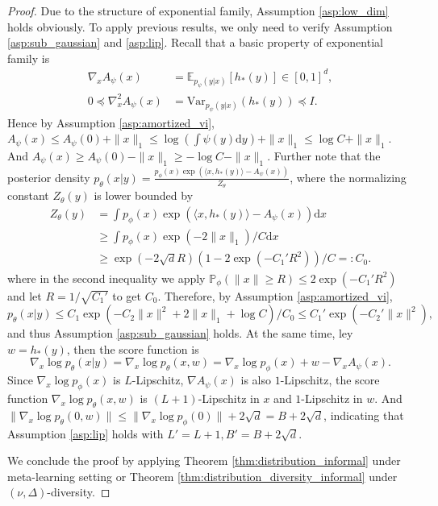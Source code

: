 \documentclass{article}
\numberwithin{equation}{section}
\newcommand{\E}{\mathbb{E}}
\newcommand{\Var}{\mathrm{Var}}
\newcommand{\dif}{\mathrm{d}}
\theoremstyle{definition}
\renewcommand{\P}{\mathbb{P}}
\begin{document}
\begin{proof}
    Due to the structure of exponential family, Assumption \ref{asp:low_dim} holds obviously.
    To apply previous results, we only need to verify Assumption \ref{asp:sub_gaussian} and \ref{asp:lip}.
    Recall that a basic property of exponential family is 
    \begin{align}
        \nabla_x A_\psi(x) &= \E_{p_\psi(y|x)}[h_*(y)]\in [0,1]^d,\\
        0\preceq \nabla_x^2 A_\psi(x) &= \Var_{ p_\psi(y|x)}(h_*(y)) \preceq I.
    \end{align}
    Hence by Assumption \ref{asp:amortized_vi}, $A_\psi(x)\leq A_\psi(0) + \|x\|_1\leq \log\left(\int \psi(y)\dif y\right)+\|x\|_1\leq \log C+\|x\|_1$. And $A_\psi(x)\geq A_\psi(0) - \|x\|_1\geq -\log C-\|x\|_1$.
    Further note that the posterior density $p_\theta(x|y)=\frac{p_\phi(x)\exp(\langle x,h_*(y)\rangle-A_\psi(x))}{Z_\theta}$, where the normalizing constant $Z_\theta(y)$ is lower bounded by
    \begin{equation}
        \begin{aligned}
            Z_\theta(y) 
            &= \int p_\phi(x)\exp(\langle x,h_*(y)\rangle-A_\psi(x)) \dif x \\
            &\geq \int p_\phi(x)\exp(-2\|x\|_1)/C \dif x \\
            &\geq \exp(-2\sqrt{d}R)(1-2\exp(-C_1'R^2)) / C=: C_0.
        \end{aligned}
    \end{equation}
    where in the second inequality we apply $\P_\phi(\|x\|\geq R)\leq 2\exp(-C_1'R^2)$ and let $R=1/\sqrt{C_1'}$ to get $C_0$.
    Therefore, by Assumption \ref{asp:amortized_vi},
    \begin{equation}
        p_\theta(x|y)\leq C_1\exp(-C_2\|x\|^2+2\|x\|_1+\log C)/C_0
        \leq C_1'\exp(-C_2'\|x\|^2),
    \end{equation}
    and thus Assumption \ref{asp:sub_gaussian} holds.
    At the same time, ley $w=h_*(y)$, then the score function is
    \begin{equation}
        \nabla_x\log p_\theta(x|y)=\nabla_x\log p_\theta(x,w)=\nabla_x\log p_\phi(x)+w-\nabla_x A_\psi(x).
    \end{equation}
    Since $\nabla_x\log p_\phi(x)$ is $L$-Lipschitz, $\nabla A_\psi(x)$ is also $1$-Lipschitz, the score function $\nabla_x\log p_\theta(x,w)$ is $(L+1)$-Lipschitz in $x$ and $1$-Lipschitz in $w$.
    And $\|\nabla_x\log p_\theta(0,w)\|\leq \|\nabla_x\log p_\phi(0)\|+2\sqrt{d}=B+2\sqrt{d}$,
    indicating that Assumption \ref{asp:lip} holds with $L'=L+1,B'=B+2\sqrt{d}$.
    
    We conclude the proof by applying Theorem \ref{thm:distribution_informal} under meta-learning setting or Theorem \ref{thm:distribution_diversity_informal} under $(\nu,\Delta)$-diversity.
\end{proof}
\end{document}
